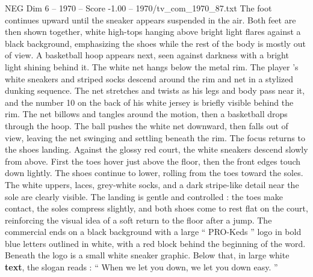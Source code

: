 \begin{textsample}{NEG Dim 6 – 1970 – Score -1.00 – 1970/tv\_com\_1970\_87.txt}
The foot continues upward until the sneaker appears suspended in the air.
Both feet are then shown together, white high-tops hanging above bright light flares against a black background, emphasizing the shoes while the rest of the body is mostly out of view.
A basketball hoop appears next, seen against darkness with a bright light shining behind it.
The white net hangs below the metal rim.
The player ’s white sneakers and striped socks descend around the rim and net in a stylized dunking sequence.
The net stretches and twists as his legs and body pass near it, and the number 10 on the back of his white jersey is briefly visible behind the rim.
The net billows and tangles around the motion, then a basketball drops through the hoop.
The ball pushes the white net downward, then falls out of view, leaving the net swinging and settling beneath the rim.
The focus returns to the shoes landing.
Against the glossy red court, the white sneakers descend slowly from above.
First the toes hover just above the floor, then the front edges touch down lightly.
The shoes continue to lower, rolling from the toes toward the soles.
The white uppers, laces, grey-white socks, and a dark stripe-like detail near the sole are clearly visible.
The landing is gentle and controlled : the toes make contact, the soles compress slightly, and both shoes come to rest flat on the court, reinforcing the visual idea of a soft return to the floor after a jump.
The commercial ends on a black background with a large “ PRO-Keds ” logo in bold blue letters outlined in white, with a red block behind the beginning of the word.
Beneath the logo is a small white sneaker graphic.
Below that, in large white \textbf{text}, the slogan reads : “ When we let you down, we let you down easy. ”

\end{textsample}
